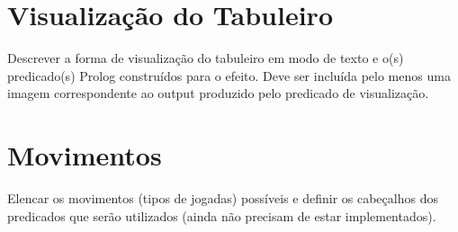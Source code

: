 \documentclass[a4paper]{article}
\begin{document}
\section{Visualização do Tabuleiro}

Descrever a forma de visualização do tabuleiro em modo de texto e o(s) predicado(s) Prolog construídos para o efeito.
Deve ser incluída pelo menos uma imagem correspondente ao output produzido pelo predicado de visualização.


\section{Movimentos}

Elencar os movimentos (tipos de jogadas) possíveis e definir os cabeçalhos dos predicados que serão utilizados (ainda não precisam de estar implementados).
\end{document}
